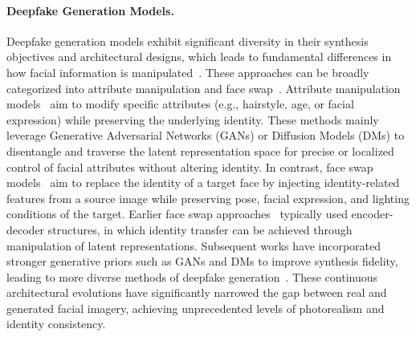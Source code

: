 \documentclass{article}
\begin{document}
\paragraph{Deepfake Generation Models.}
\label{subsec:deepfake_gen}
Deepfake generation models exhibit significant diversity in their synthesis objectives and architectural designs, which leads to fundamental differences in how facial information is manipulated~\cite{choi2018stargan, chen2020simswap}. These approaches can be broadly categorized into attribute manipulation and face swap~\cite{pei2024deepfake}. Attribute manipulation models~\cite{choi2018stargan,patashnik2021styleclip,preechakul2022diffusion} aim to modify specific attributes (e.g., hairstyle, age, or facial expression) while preserving the underlying identity. These methods mainly leverage Generative Adversarial Networks (GANs) or Diffusion Models (DMs) to disentangle and traverse the latent representation space for precise or localized control of facial attributes without altering identity. In contrast, face swap models~\cite{chen2020simswap, richardson2021encoding, shiohara2023blendface} aim to replace the identity of a target face by injecting identity-related features from a source image while preserving pose, facial expression, and lighting conditions of the target. Earlier face swap approaches~\cite{oldpan_faceswap_pytorch} typically used encoder-decoder structures, in which identity transfer can be achieved through manipulation of latent representations. Subsequent works have incorporated stronger generative priors such as GANs and DMs to improve synthesis fidelity, leading to more diverse methods of deepfake generation~\cite{preechakul2022diffusion, kim2022diffusionclip, zhao2023diffswap, kim2025diffface}. These continuous architectural evolutions have significantly narrowed the gap between real and generated facial imagery, achieving unprecedented levels of photorealism and identity consistency.
\end{document}
